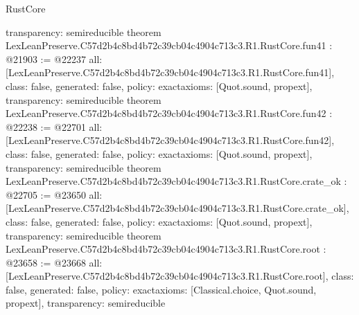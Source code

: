 \begin{lexlean}{RustCore}
\begin{coremodule}
{  transparency: semireducible
}
theorem LexLeanPreserve.C57d2b4c8bd4b72c39cb04c4904c713c3.R1.RustCore.fun41 : @21903 := @22237 {
  all: [LexLeanPreserve.C57d2b4c8bd4b72c39cb04c4904c713c3.R1.RustCore.fun41],
  class: false,
  generated: false,
  policy: exact{axioms: [Quot.sound, propext]},
  transparency: semireducible
}
theorem LexLeanPreserve.C57d2b4c8bd4b72c39cb04c4904c713c3.R1.RustCore.fun42 : @22238 := @22701 {
  all: [LexLeanPreserve.C57d2b4c8bd4b72c39cb04c4904c713c3.R1.RustCore.fun42],
  class: false,
  generated: false,
  policy: exact{axioms: [Quot.sound, propext]},
  transparency: semireducible
}
theorem LexLeanPreserve.C57d2b4c8bd4b72c39cb04c4904c713c3.R1.RustCore.crate_ok : @22705 := @23650 {
  all: [LexLeanPreserve.C57d2b4c8bd4b72c39cb04c4904c713c3.R1.RustCore.crate_ok],
  class: false,
  generated: false,
  policy: exact{axioms: [Quot.sound, propext]},
  transparency: semireducible
}
theorem LexLeanPreserve.C57d2b4c8bd4b72c39cb04c4904c713c3.R1.RustCore.root : @23658 := @23668 {
  all: [LexLeanPreserve.C57d2b4c8bd4b72c39cb04c4904c713c3.R1.RustCore.root],
  class: false,
  generated: false,
  policy: exact{axioms: [Classical.choice, Quot.sound, propext]},
  transparency: semireducible
}


\end{coremodule}
\end{lexlean}
